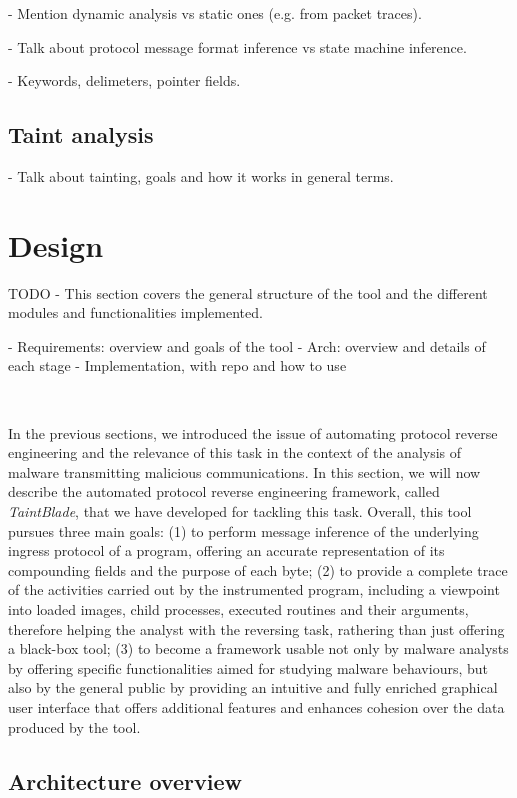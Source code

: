 \documentclass[conference]{IEEEtran}
\begin{document}
- Mention dynamic analysis vs static ones (e.g. from packet traces).

- Talk about protocol message format inference vs state machine inference.

- Keywords, delimeters, pointer fields.

\subsection {Taint analysis}
- Talk about tainting, goals and how it works in general terms.



\section{Design}
TODO - This section covers the general structure of the tool and the different
modules and functionalities implemented.

- Requirements: overview and goals of the tool
- Arch: overview and details of each stage
- Implementation, with repo and how to use

\

In the previous sections, we introduced the issue of automating protocol
reverse engineering and the relevance of this task in the context of the
analysis of malware transmitting malicious communications. In this section, we
will now describe the automated protocol reverse engineering framework, called
\textit{TaintBlade}, that we have developed for tackling this task. Overall,
this tool pursues three main goals: (1) to perform message inference of the
underlying ingress protocol of a program, offering an accurate representation
of its compounding fields and the purpose of each byte; (2) to provide a
complete trace of the activities carried out by the instrumented program,
including a viewpoint into loaded images, child processes, executed routines
and their arguments, therefore helping the analyst with the reversing task,
rathering than just offering a black-box tool; (3) to become a framework usable
not only by malware analysts by offering specific functionalities aimed for
studying malware behaviours, but also by the general public by providing an
intuitive and fully enriched graphical user interface that offers additional
features and enhances cohesion over the data produced by the tool.

\subsection{Architecture overview}
\end{document}
